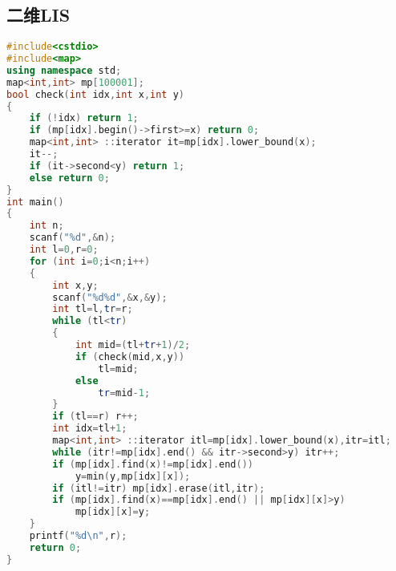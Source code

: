 \subsection{二维LIS}
    \begin{lstlisting}[language=c++]
#include<cstdio>
#include<map>
using namespace std;
map<int,int> mp[100001];
bool check(int idx,int x,int y)
{
    if (!idx) return 1;
    if (mp[idx].begin()->first>=x) return 0;
    map<int,int> ::iterator it=mp[idx].lower_bound(x);
    it--;
    if (it->second<y) return 1;
    else return 0;
}
int main()
{
    int n;
    scanf("%d",&n);
    int l=0,r=0;
    for (int i=0;i<n;i++)
    {
        int x,y;
        scanf("%d%d",&x,&y);
        int tl=l,tr=r;
        while (tl<tr)
        {
            int mid=(tl+tr+1)/2;
            if (check(mid,x,y))
                tl=mid;
            else
                tr=mid-1;
        }
        if (tl==r) r++;
        int idx=tl+1;
        map<int,int> ::iterator itl=mp[idx].lower_bound(x),itr=itl;
        while (itr!=mp[idx].end() && itr->second>y) itr++;
        if (mp[idx].find(x)!=mp[idx].end())
            y=min(y,mp[idx][x]);
        if (itl!=itr) mp[idx].erase(itl,itr);
        if (mp[idx].find(x)==mp[idx].end() || mp[idx][x]>y)
            mp[idx][x]=y;
    }
    printf("%d\n",r);
    return 0;
}
    \end{lstlisting}
